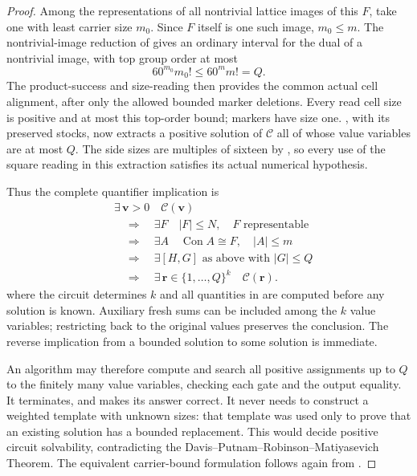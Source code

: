 \begin{proof}
Among the representations of all nontrivial lattice
images of this $F$, take one with least carrier size
$m_0$.  Since $F$ itself is one such image, $m_0\le m$.
The nontrivial-image reduction of
 gives an ordinary interval
for the dual of a nontrivial image, with top group
order at most
\[
 60^{m_0}m_0!\le60^m m!=Q.
\]
The product-success and size-reading
 then provides the common
actual cell alignment, after only the allowed bounded
marker deletions.  Every read cell size is positive
and at most this top-order bound; markers have size
one.  , with its preserved
stocks, now extracts a positive solution of
$\mathcal C$ all of whose value variables are at most
$Q$.  The side sizes are multiples of sixteen by
, so every use of the square reading
in this extraction satisfies its actual numerical
hypothesis.

Thus the complete quantifier implication is
\begin{equation}\label{n:quantifier-chain}
 \begin{aligned}
 &\exists\,\mathbf v>0\quad\mathcal C(\mathbf v)
 \\
 &\quad\Longrightarrow\quad
 \exists F\quad |F|\le N,\quad F\text{ representable}
 \\
 &\quad\Longrightarrow\quad
 \exists A\quad \operatorname{Con}A\cong F,\quad |A|\le m
 \\
 &\quad\Longrightarrow\quad
 \exists[H,G]\text{ as above with }|G|\le Q
 \\
 &\quad\Longrightarrow\quad
 \exists\,\mathbf r\in\{1,\ldots,Q\}^{k}
       \quad\mathcal C(\mathbf r).
 \end{aligned}
\end{equation}
where the circuit determines $k$ and all quantities in
 are computed before
any solution is known.  Auxiliary fresh sums can be
included among the $k$ value variables; restricting
back to the original values preserves the conclusion.
The reverse implication from a bounded solution to
some solution is immediate.

An algorithm may therefore compute
 and search all positive
assignments up to $Q$ to the finitely many value
variables, checking each gate and the output equality.
It terminates, and  makes its
answer correct.  It never needs to construct a weighted
template with unknown sizes: that template was used
only to prove that an existing solution has a bounded
replacement.  This would decide positive circuit
solvability, contradicting the
Davis--Putnam--Robinson--Matiyasevich Theorem.
The equivalent carrier-bound formulation follows
again from .
\end{proof}

